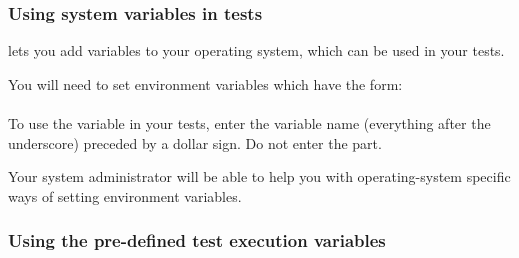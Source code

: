 \subsubsection{Using system variables in tests}
\label{TasksSystemVariables}


\app{} lets you add variables to your operating system, which can be used in your tests. 

You will need to set environment variables which have the form:\\

\\


To use the variable in your tests, enter the variable name (everything after the underscore) preceded by a dollar sign. Do not enter the  part.


Your system administrator will be able to help you with operating-system specific ways of setting environment variables. 



\subsubsection{Using the \app{} pre-defined test execution variables}
\label{TasksPredefinedVariables}

